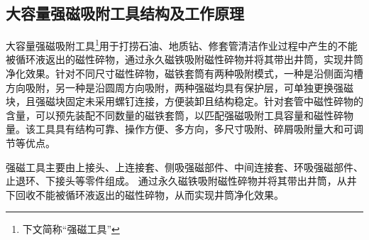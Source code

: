 \subsection{大容量强磁吸附工具结构及工作原理}
大容量强磁吸附工具\footnote{下文简称“强磁工具”}用于打捞石油、地质钻、修套管清洁作业过程中产生的不能被循环液返出的磁性碎物，通过永久磁铁吸附磁性碎物并将其带出井筒，实现井筒净化效果。针对不同尺寸磁性碎物，磁铁套筒有两种吸附模式，一种是沿侧面沟槽方向吸附，另一种是沿圆周方向吸附，两种强磁均具有保护层，可单独更换强磁块，且强磁块固定未采用螺钉连接，方便装卸且结构稳定。针对套管中磁性碎物的含量，可以预先装配不同数量的磁铁套筒，以匹配强磁吸附工具容量和磁性碎物量。该工具具有结构可靠、操作方便、多方向，多尺寸吸附、碎屑吸附量大和可调节等优点。

强磁工具主要由上接头、上连接套、侧吸强磁部件、中间连接套、环吸强磁部件、止退环、下接头等零件组成。
通过永久磁铁吸附磁性碎物并将其带出井筒，从井下回收不能被循环液返出的磁性碎物，从而实现井筒净化效果。


